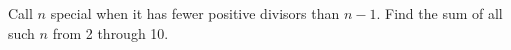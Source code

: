 Call $n$ special when it has fewer positive divisors than $n-1$. Find the sum of all such $n$ from 2 through 10.
